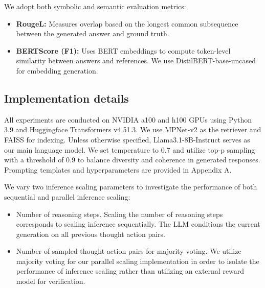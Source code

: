 We adopt both symbolic and semantic evaluation metrics:

\begin{itemize}
    \item \textbf{RougeL:} Measures overlap based on the longest common subsequence between the generated answer and ground truth.
    \item \textbf{BERTScore (F1):} Uses BERT embeddings to compute token-level similarity between answers and references. We use DistilBERT-base-uncased for embedding generation.
\end{itemize}

\subsection{Implementation details}

All experiments are conducted on NVIDIA a100 and h100 GPUs using Python 3.9 and Huggingface Transformers v4.51.3. We use MPNet-v2 as the retriever and FAISS \citep{johnson2019billion} for indexing. Unless otherwise specified, Llama3.1-8B-Instruct serves as our main language model. We set temperature to 0.7 and utilize top-p sampling with a threshold of 0.9 to balance diversity and coherence in generated responses. Prompting templates and hyperparameters are provided in Appendix A.

We vary two inference scaling parameters to investigate the performance of both sequential and parallel inference scaling:
\begin{itemize}
    \item Number of reasoning steps. Scaling the number of reasoning steps corresponds to scaling inference sequentially. The LLM conditions the current generation on all previous thought action pairs.  
    \item Number of sampled thought-action pairs for majority voting. We utilize majority voting for our parallel scaling implementation in order to isolate the performance of inference scaling rather than utilizing an external reward model for verification.
\end{itemize}




